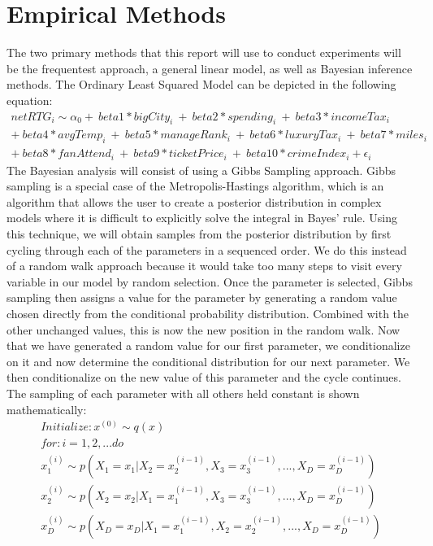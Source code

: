 \documentclass[12pt,english]{article}
\begin{document}
\section{Empirical Methods}\label{sec:methods}
The two primary methods that this report will use to conduct experiments will be the frequentest approach, a general linear model, as well as Bayesian inference methods. 
The Ordinary Least Squared Model can be depicted in the following equation:
\begin{align*}
    \label{eq:1}
netRTG_{i} \sim \alpha_0 + \ beta1 * bigCity_{i}\ + \ beta2 * spending_{i} \ + \ beta3 * incomeTax_{i} \\
+ \ beta4 * avgTemp_{i} \ + \ beta5 * manageRank_{i} \ + \ beta6 * luxuryTax_{i} \ + \ beta7 * miles_{i} \\ + \ beta8 * fanAttend_{i}\ + \ beta9 * ticketPrice_{i} \ +  \ beta10 * crimeIndex_{i} + \epsilon_{i}
\end{align*}
The Bayesian analysis will consist of using a Gibbs Sampling approach. Gibbs sampling is a special case of the Metropolis-Hastings algorithm, which is an algorithm that allows the user to create a posterior distribution in complex models where it is difficult to explicitly solve the integral in Bayes' rule. Using this technique, we will obtain samples from the posterior distribution by first cycling through each of the parameters in a sequenced  order. We do this instead of a random walk approach because it would take too many steps to visit every variable in our model by random selection. Once the parameter is selected, Gibbs sampling then assigns a value for the parameter by generating a random value chosen directly from the conditional probability distribution. Combined with the other unchanged values, this is now the new position in the random walk. Now that we have generated a random value for our first parameter, we conditionalize on it and now determine the conditional distribution for our next parameter. We then conditionalize on the new value of this parameter and the cycle continues. The sampling of each parameter with all others held constant is shown mathematically:
\begin{align*}
\label{eq:2}
Initialize: x^{(0)} \sim q(x)\\
for: i = 1, 2, ...do\\
x_1^{(i)} \sim p(X_1 = x_1| X_2 = x_2^{(i-1)}, X_3 = x_3 ^{(i-1)},...,X_D = x_D^{(i-1)})\\
x_2^{(i)} \sim p(X_2 = x_2| X_1 = x_1^{(i-1)}, X_3 = x_3 ^{(i-1)},...,X_D = x_D^{(i-1)})\\
x_D^{(i)} \sim p(X_D = x_D| X_1 = x_1^{(i-1)}, X_2 = x_2 ^{(i-1)},...,X_D = x_D^{(i-1)})
\end{align*}
\end{document}
